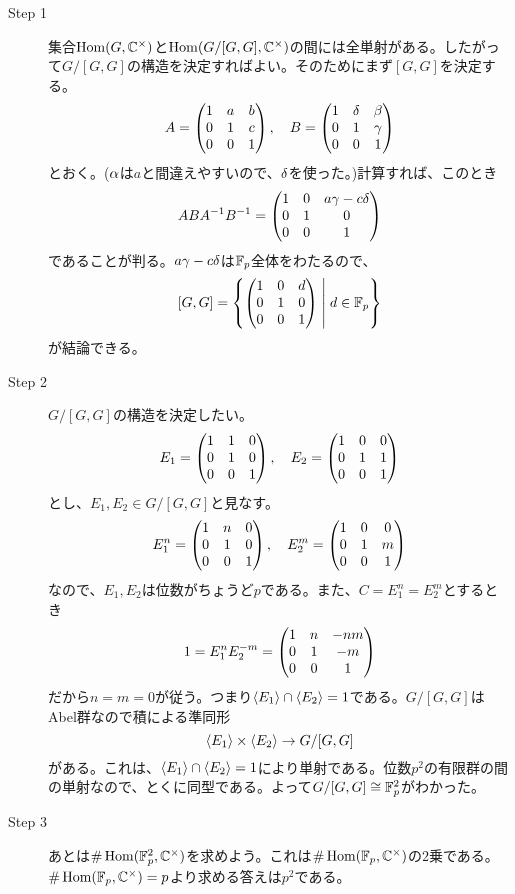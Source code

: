 \begin{sol} ${}$
  \begin{description}
    \item[Step 1] 集合$\operatorname{Hom}(G, {\mathbb C}^{\times})$と$\operatorname{Hom}(G/[G,G], {\mathbb C}^{\times})$の間には全単射がある。したがって$G/[G,G]$の構造を決定すればよい。そのためにまず$[G,G]$を決定する。
    \[
    A = \begin{pmatrix} 1 & a & b \\ 0 & 1 & c \\ 0 & 0 & 1 \end{pmatrix},  \quad B = \begin{pmatrix} 1 & {\delta} & \beta \\ 0 & 1 & {\gamma} \\ 0 & 0 & 1 \end{pmatrix}
    \]
    とおく。(${\alpha}$は$a$と間違えやすいので、${\delta}$を使った。)計算すれば、このとき
    \begin{align*}
    ABA^{-1}B^{-1} = \begin{pmatrix} 1 & 0  & a {\gamma} - c {\delta} \\ 0 & 1 & 0 \\ 0 & 0 & 1  \end{pmatrix} \\
  \end{align*}
  であることが判る。$a {\gamma} - c {\delta}$は${\mathbb F}_p$全体をわたるので、
  \[
  [G,G] = \left\{  \begin{pmatrix} 1 & 0 & d \\ 0 & 1 & 0 \\ 0 & 0 & 1 \end{pmatrix}  \mathrel{} \middle| \mathrel{} d \in {\mathbb F}_p  \right\}
  \]
  が結論できる。
  \item[Step 2] $G/[G,G]$の構造を決定したい。
  \[
  E_1 = \begin{pmatrix} 1 & 1 & 0 \\ 0 & 1 & 0 \\ 0 & 0 & 1 \end{pmatrix}, \quad E_2 =  \begin{pmatrix} 1 & 0 & 0 \\ 0 & 1 & 1 \\ 0 & 0 & 1 \end{pmatrix}
  \]
  とし、$E_1, E_2 \in G/ [G,G]$と見なす。
  \[
  E_1^n = \begin{pmatrix} 1 & n & 0 \\ 0 & 1 & 0 \\ 0 & 0 & 1 \end{pmatrix}, \quad E_2^m =  \begin{pmatrix} 1 & 0 & 0 \\ 0 & 1 & m \\ 0 & 0 & 1 \end{pmatrix}
  \]
  なので、$E_1, E_2$は位数がちょうど$p$である。また、$C = E_1^n = E_2^m$とするとき
  \[
  1 = E_1^n E_2^{-m} = \begin{pmatrix}  1 & n & -nm \\ 0 & 1 & -m \\ 0 & 0 & 1 \end{pmatrix}
  \]
  だから$n=m=0$が従う。つまり$\langle E_1 \rangle \cap \langle E_2 \rangle = 1$である。$G/[G,G]$はAbel群なので積による準同形
  \[
  \langle E_1 \rangle \times \langle E_2 \rangle \to G/[G,G]
  \]
  がある。これは、$\langle E_1 \rangle \cap \langle E_2 \rangle = 1$により単射である。位数$p^2$の有限群の間の単射なので、とくに同型である。よって$G/[G,G] \cong {\mathbb F}_p^2$がわかった。
  \item[Step 3] あとは$\# \operatorname{Hom}({\mathbb F}_p^2, {\mathbb C}^{\times})$を求めよう。これは$\# \operatorname{Hom}({\mathbb F}_p,{\mathbb C}^{\times})$の$2$乗である。$\# \operatorname{Hom}({\mathbb F}_p,{\mathbb C}^{\times}) = p$より求める答えは$p^2$である。
  \end{description}
\end{sol}

